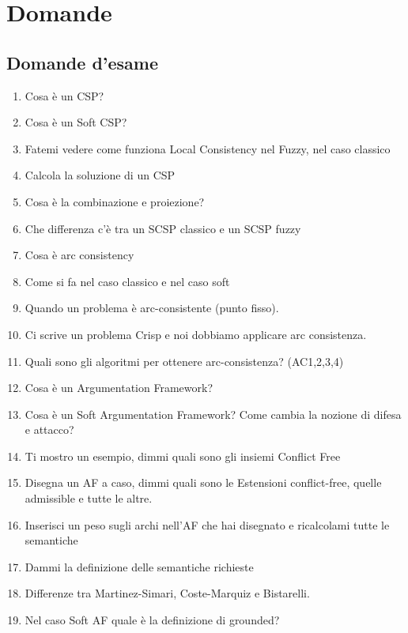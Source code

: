 \chapter{Domande} \label{Domande}
\section{Domande d'esame}
\begin{enumerate}
    \item Cosa è un CSP?
    \item Cosa è un Soft CSP?
    \item Fatemi vedere come funziona Local Consistency nel Fuzzy, nel caso
          classico
    \item Calcola la soluzione di un CSP
    \item Cosa è la combinazione e proiezione?
    \item Che differenza c'è tra un SCSP classico e un SCSP fuzzy
    \item Cosa è arc consistency
    \item Come si fa nel caso classico e nel caso soft
    \item Quando un problema è arc-consistente (punto fisso).
    \item Ci scrive un problema Crisp e noi dobbiamo applicare arc consistenza.
    \item Quali sono gli algoritmi per ottenere arc-consistenza? (AC1,2,3,4)
    \item Cosa è un Argumentation Framework?
    \item Cosa è un Soft Argumentation Framework? Come cambia la nozione di
          difesa e attacco?
    \item Ti mostro un esempio, dimmi quali sono gli insiemi Conflict Free
    \item Disegna un AF a caso, dimmi quali sono le Estensioni conflict-free,
          quelle admissible e tutte le altre.
    \item Inserisci un peso sugli archi nell'AF che hai disegnato e ricalcolami
          tutte le semantiche
    \item Dammi la definizione delle semantiche richieste
    \item Differenze tra Martinez-Simari, Coste-Marquiz e Bistarelli.
    \item Nel caso Soft AF quale è la definizione di grounded?
\end{enumerate}



